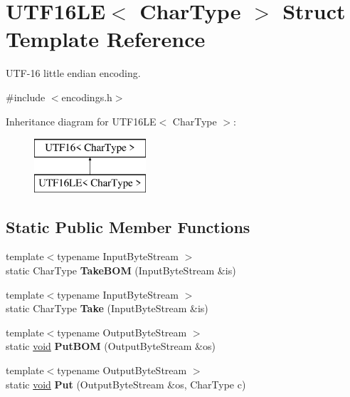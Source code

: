 \hypertarget{struct_u_t_f16_l_e}{}\section{U\+T\+F16\+L\+E$<$ Char\+Type $>$ Struct Template Reference}
\label{struct_u_t_f16_l_e}


U\+T\+F-\/16 little endian encoding.  




{\ttfamily \#include $<$encodings.\+h$>$}

Inheritance diagram for U\+T\+F16\+L\+E$<$ Char\+Type $>$\+:\begin{figure}[H]
\begin{center}
\leavevmode
\includegraphics[height=2.000000cm]{struct_u_t_f16_l_e}
\end{center}
\end{figure}
\subsection*{Static Public Member Functions}
\begin{DoxyCompactItemize}
\item 
\hypertarget{struct_u_t_f16_l_e_ab1d5f43903815155796733f76b21deea}{}{\footnotesize template$<$typename Input\+Byte\+Stream $>$ }\\static Char\+Type {\bfseries Take\+B\+O\+M} (Input\+Byte\+Stream \&is)\label{struct_u_t_f16_l_e_ab1d5f43903815155796733f76b21deea}

\item 
\hypertarget{struct_u_t_f16_l_e_a5927b3d75ff9ce02056d827c14bd0160}{}{\footnotesize template$<$typename Input\+Byte\+Stream $>$ }\\static Char\+Type {\bfseries Take} (Input\+Byte\+Stream \&is)\label{struct_u_t_f16_l_e_a5927b3d75ff9ce02056d827c14bd0160}

\item 
\hypertarget{struct_u_t_f16_l_e_a6bfd05f8cac35c1594c7fce47009f198}{}{\footnotesize template$<$typename Output\+Byte\+Stream $>$ }\\static \hyperlink{_s_d_l__audio_8h_a52835ae37c4bb905b903cbaf5d04b05f}{void} {\bfseries Put\+B\+O\+M} (Output\+Byte\+Stream \&os)\label{struct_u_t_f16_l_e_a6bfd05f8cac35c1594c7fce47009f198}

\item 
\hypertarget{struct_u_t_f16_l_e_ac018cc43a1dba5a6ca232bd9a257072c}{}{\footnotesize template$<$typename Output\+Byte\+Stream $>$ }\\static \hyperlink{_s_d_l__audio_8h_a52835ae37c4bb905b903cbaf5d04b05f}{void} {\bfseries Put} (Output\+Byte\+Stream \&os, Char\+Type c)\label{struct_u_t_f16_l_e_ac018cc43a1dba5a6ca232bd9a257072c}

\end{DoxyCompactItemize}
